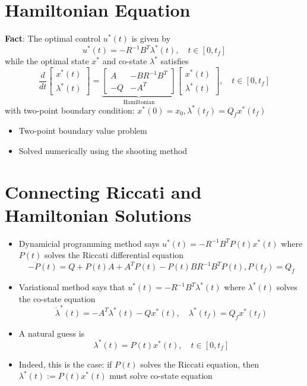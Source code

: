 \documentclass[10pt,a4paper,oneside]{article}
\begin{document}
\section{Hamiltonian Equation}
{\bfseries Fact}: The optimal control $u^*(t)$ is given by
$$
u^{*}(t)=-R^{-1} B^{T} \lambda^{*}(t), \quad t \in\left[0, t_{f}\right]
$$
while the optimal state $x^*$ and co-state $\lambda^*$ satisfies
$$
\frac{d}{d t}\left[\begin{array}{l}{x^{*}(t)} \\ {\lambda^{*}(t)}\end{array}\right]=\underbrace{\left[\begin{array}{cc}{A} & {-B R^{-1} B^{T}} \\ {-Q} & {-A^{T}}\end{array}\right]}_{\text { Hamiltonian }}\left[\begin{array}{c}{x^{*}(t)} \\ {\lambda^{*}(t)}\end{array}\right], \quad t \in\left[0, t_{f}\right]
$$
with two-point boundary condition: $x^{*}(0)=x_{0}, \lambda^{*}\left(t_{f}\right)=Q_{f} x^{*}\left(t_{f}\right)$
\begin{itemize}
\item Two-point boundary value problem
\item Solved numerically using the shooting method
\end{itemize}
\section{Connecting Riccati and Hamiltonian Solutions}
\begin{itemize}
\item Dynamicial programming method says $u^{*}(t)=-R^{-1} B^{T} P(t) x^{*}(t)$ where $P(t)$ solves the Riccati differential equation
$$
-\dot{P}(t)=Q+P(t) A+A^{T} P(t)-P(t) B R^{-1} B^{T} P(t), P\left(t_{f}\right)=Q_{f}
$$
\item Variational method says that $u^{*}(t)=-R^{-1} B^{T} \lambda^{*}(t)$ where $\lambda^*(t)$ solves the co-state equation
$$
\dot{\lambda}^{*}(t)=-A^{T} \lambda^{*}(t)-Q x^{*}(t), \quad \lambda^{*}\left(t_{f}\right)=Q_{f} x^{*}\left(t_{f}\right)
$$
\item A natural guess is 
$$
\lambda^{*}(t)=P(t) x^{*}(t), \quad t \in\left[0, t_{f}\right]
$$
\item Indeed, this is the case: if $P(t)$ solves the Riccati equation, then $
\lambda^{*}(t) :=P(t) x^{*}(t)
$ must solve co-state equation
\end{itemize}
\end{document}
